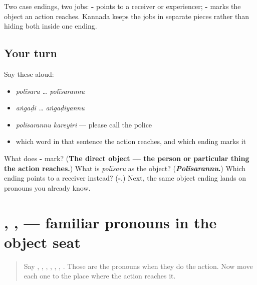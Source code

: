 \begin{grammarlens}[title={What you've built}]
Two case endings, two jobs: \textbf{-} points to a receiver or experiencer; \textbf{-} marks the object an action reaches. Kannada keeps the jobs in separate pieces rather than hiding both inside one ending.
\end{grammarlens}

\subsection*{Your turn}
Say these aloud:

\begin{itemize}
\raggedright
  \item \emph{polīsaru … polīsarannu}
  \item \emph{aṅgaḍi … aṅgaḍiyannu}
  \item \emph{polīsarannu kareyiri} — please call the police
  \item which word in that sentence the action reaches, and which ending marks it
\end{itemize}

\begin{tcolorbox}[breakable,colback=teal!4,colframe=teal!35!black,title={Before you move on}]
What does \textbf{-} mark? (\textbf{The direct object — the person or particular thing the action reaches.}) What is \emph{polīsaru} as the object? (\textbf{\emph{Polīsarannu}.}) Which ending points to a receiver instead? (\textbf{-}.) Next, the same object ending lands on pronouns you already know.
\end{tcolorbox}
\section[\texorpdfstring{\kn{ನನ್ನನ್ನು} / \kn{ನಿಮ್ಮನ್ನು} … (nannannu …)}{ನನ್ನನ್ನು / ನಿಮ್ಮನ್ನು … (nannannu …)}]{, ,  — familiar pronouns in the object seat}

\label{lesson:KA-C104-object-pronouns}



\begin{quote}
Say \textbf{}, \textbf{}, \textbf{}, \textbf{}, \textbf{}, \textbf{}, \textbf{}. Those are the pronouns when they do the action. Now move each one to the place where the action reaches it.
\end{quote}

